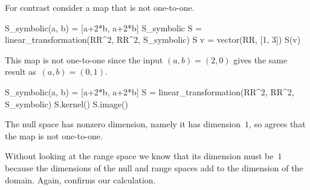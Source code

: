 For contrast consider a map that is not one-to-one.
\begin{sageoutput}[s,8,68,62;s,9,70,62]
S_symbolic(a, b) = [a+2*b, a+2*b]
S_symbolic
S = linear_transformation(RR^2, RR^2, S_symbolic)
S
v = vector(RR, [1, 3])  
S(v)
\end{sageoutput}
\noindent This map is not one-to-one since the input $(a,b)=(2,0)$  gives
the same result as~$(a,b)=(0,1)$.  
\begin{sageoutput}[d,0,2;s,3,69,58;s,7,70,59]
S_symbolic(a, b) = [a+2*b, a+2*b]
S = linear_transformation(RR^2, RR^2, S_symbolic)
S.kernel()
S.image()
\end{sageoutput}
The null space has nonzero dimension, namely it 
has dimension~$1$,
so \Sage{} agrees that the map is not one-to-one.

Without looking at the range space we know that its dimension must be~$1$ 
because the dimensions of the null and range spaces add to
the dimension of the domain.
Again, \Sage{} confirms our calculation.



